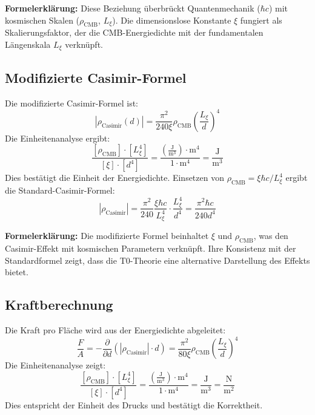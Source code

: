 \documentclass[12pt,a4paper]{article}
\theoremstyle{definition}
\theoremstyle{remark}
\begin{document}
	\textbf{Formelerkl\"arung:} Diese Beziehung \"uberbr\"uckt Quantenmechanik ($\hbar c$) mit kosmischen Skalen ($\rho_{\text{CMB}}$, $L_\xi$). Die dimensionslose Konstante $\xi$ fungiert als Skalierungsfaktor, der die CMB-Energiedichte mit der fundamentalen L\"angenskala $L_\xi$ verkn\"upft.
	
	\subsection{Modifizierte Casimir-Formel}
	Die modifizierte Casimir-Formel ist:
	\begin{equation}
		|\rho_{\text{Casimir}}(d)| = \frac{\pi^2}{240 \xi} \rho_{\text{CMB}} \left( \frac{L_\xi}{d} \right)^4
	\end{equation}
	Die Einheitenanalyse ergibt:
	\begin{equation}
		\frac{[\rho_{\text{CMB}}] \cdot [L_\xi^4]}{[\xi] \cdot [d^4]} = \frac{\left( \frac{\text{J}}{\text{m}^3} \right) \cdot \text{m}^4}{1 \cdot \text{m}^4} = \frac{\text{J}}{\text{m}^3}
	\end{equation}
	Dies best\"atigt die Einheit der Energiedichte. Einsetzen von $\rho_{\text{CMB}} = \xi \hbar c / L_\xi^4$ ergibt die Standard-Casimir-Formel:
	\begin{equation}
		|\rho_{\text{Casimir}}| = \frac{\pi^2}{240} \frac{\xi \hbar c}{L_\xi^4} \cdot \frac{L_\xi^4}{d^4} = \frac{\pi^2 \hbar c}{240 d^4}
	\end{equation}
	
	\textbf{Formelerkl\"arung:} Die modifizierte Formel beinhaltet $\xi$ und $\rho_{\text{CMB}}$, was den Casimir-Effekt mit kosmischen Parametern verkn\"upft. Ihre Konsistenz mit der Standardformel zeigt, dass die T0-Theorie eine alternative Darstellung des Effekts bietet.
	
	\subsection{Kraftberechnung}
	Die Kraft pro Fl\"ache wird aus der Energiedichte abgeleitet:
	\begin{equation}
		\frac{F}{A} = -\frac{\partial}{\partial d} \left( |\rho_{\text{Casimir}}| \cdot d \right) = \frac{\pi^2}{80 \xi} \rho_{\text{CMB}} \left( \frac{L_\xi}{d} \right)^4
	\end{equation}
	Die Einheitenanalyse zeigt:
	\begin{equation}
		\frac{[\rho_{\text{CMB}}] \cdot [L_\xi^4]}{[\xi] \cdot [d^4]} = \frac{\left( \frac{\text{J}}{\text{m}^3} \right) \cdot \text{m}^4}{1 \cdot \text{m}^4} = \frac{\text{J}}{\text{m}^3} = \frac{\text{N}}{\text{m}^2}
	\end{equation}
	Dies entspricht der Einheit des Drucks und best\"atigt die Korrektheit.
	
\end{document}
